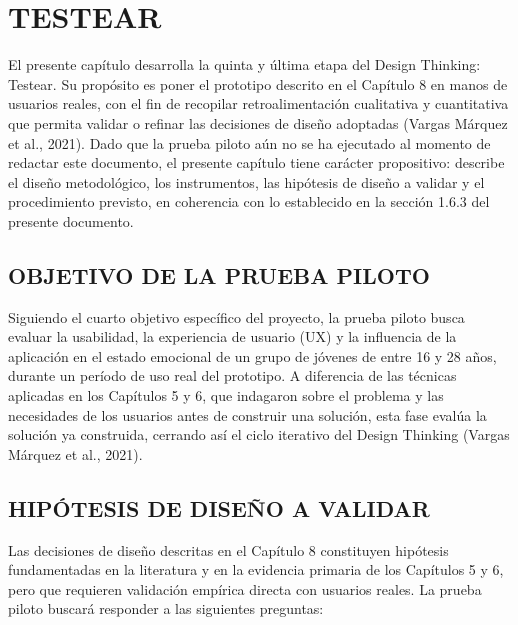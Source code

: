 \chapter{TESTEAR}
El presente capítulo desarrolla la quinta y última etapa del Design Thinking: Testear. Su propósito es poner el prototipo descrito en el Capítulo 8 en manos de usuarios reales, con el fin de recopilar retroalimentación cualitativa y cuantitativa que permita validar o refinar las decisiones de diseño adoptadas (Vargas Márquez et al., 2021). Dado que la prueba piloto aún no se ha ejecutado al momento de redactar este documento, el presente capítulo tiene carácter propositivo: describe el diseño metodológico, los instrumentos, las hipótesis de diseño a validar y el procedimiento previsto, en coherencia con lo establecido en la sección 1.6.3 del presente documento.

\section{OBJETIVO DE LA PRUEBA PILOTO}
Siguiendo el cuarto objetivo específico del proyecto, la prueba piloto busca evaluar la usabilidad, la experiencia de usuario (UX) y la influencia de la aplicación en el estado emocional de un grupo de jóvenes de entre 16 y 28 años, durante un período de uso real del prototipo. A diferencia de las técnicas aplicadas en los Capítulos 5 y 6, que indagaron sobre el problema y las necesidades de los usuarios antes de construir una solución, esta fase evalúa la solución ya construida, cerrando así el ciclo iterativo del Design Thinking (Vargas Márquez et al., 2021).

\section{HIPÓTESIS DE DISEÑO A VALIDAR}
Las decisiones de diseño descritas en el Capítulo 8 constituyen hipótesis fundamentadas en la literatura y en la evidencia primaria de los Capítulos 5 y 6, pero que requieren validación empírica directa con usuarios reales. La prueba piloto buscará responder a las siguientes preguntas:

